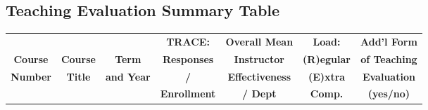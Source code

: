 \begin{landscape}

    \begin{center}
        \vspace{1.0cm}
        
        \section*{Teaching Evaluation Summary Table}
    
        \vspace{1.0cm}
        \def\arraystretch{1.1}

        \begin{tabular}{ | c | c | c | c | c | c | c | }
            \hline
            & & & \footnotesize{\textbf{TRACE:}} & \footnotesize{\textbf{Overall Mean}} & \footnotesize{\textbf{Load:}} & \footnotesize{\textbf{Add'l Form}} \\
            \footnotesize{\textbf{Course}} & \footnotesize{\textbf{Course}}  &  \footnotesize{\textbf{Term}}  & \footnotesize{\textbf{Responses}} & \footnotesize{\textbf{Instructor}} & \footnotesize{\textbf{(R)egular}} & \footnotesize{\textbf{of Teaching}} \\
            \footnotesize{\textbf{Number}} & \footnotesize{\textbf{Title}} & \footnotesize{\textbf{and Year}} & \footnotesize{\textbf{/}} & \footnotesize{\textbf{Effectiveness}} & \footnotesize{\textbf{(E)xtra}} & \footnotesize{\textbf{Evaluation}} \\
            & & & \footnotesize{\textbf{Enrollment}} & \footnotesize{\textbf{/ Dept}} & \footnotesize{\textbf{Comp.}} & \footnotesize{\textbf{(yes/no)}} \\ \hline


\end{tabular}
\end{center}
\end{landscape}
